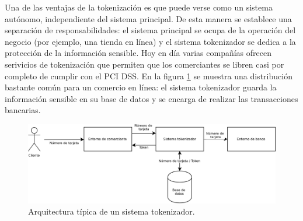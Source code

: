 Una de las ventajas de la tokenización es que puede verse como un sistema
autónomo, independiente del sistema principal. De esta manera se establece una
separación de responsabilidades: el sistema principal se ocupa de la operación
del negocio (por ejemplo, una tienda en línea) y el sistema tokenizador se
dedica a la protección de la información sensible. Hoy en día varias compañías
ofrecen serivicios de tokenización que permiten que los comerciantes se libren
casi por completo de cumplir con el PCI DSS. En la figura
\ref{figura:arquitectura_tokenizacion} se muestra una distribución bastante
común para un comercio en línea: el sistema tokenizador guarda la información
sensible en su base de datos y se encarga de realizar las transacciones
bancarias.

\begin{figure}
  \begin{center}
    \includegraphics[width=1.0\linewidth]
      {algoritmos_tokenizadores/diagramas/sistema_tokenizador.png}
    \caption{Arquitectura típica de un sistema tokenizador.}
    \label{figura:arquitectura_tokenizacion}
  \end{center}
\end{figure}




